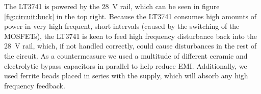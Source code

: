 The LT3741 is powered by the \SI{28}{\volt} rail, which can  be  seen  in figure
\ref{fig:circuit:buck} in  the  top  right.  Because  the  LT3741  consumes high
amounts of power in very high frequent, short intervals (caused by the switching
of the MOSFETs), the LT3741 is keen to feed high frequency disturbance back into
the  \SI{28}{\volt}   rail,   which,  if  not  handled  correctly,  could  cause
disturbances in the rest of the circuit. As a countermeasure we used a multitude
of different ceramic and electrolytic  bypass  capacitors  in  parallel  to help
reduce  EMI.  Additionally,  we  used  ferrite beads placed in series  with  the
supply, which will absorb any high frequency feedback.

